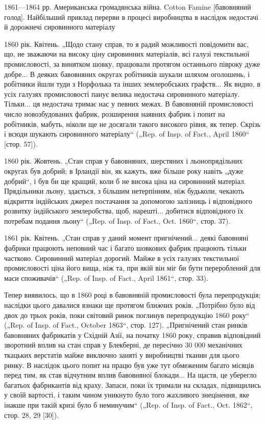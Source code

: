 1861—1864 рр. Американська громадянська війна. Cotton Famine [бавовняний
голод]. Найбільший приклад перерви в процесі виробництва в наслідок
недостачі й дорожнечі сировинного матеріалу

1860 рік. Квітень. „Щодо стану справ, то я радий можливості
повідомити вас, що, не зважаючи на високу ціну сировинних
матеріалів, всі галузі текстильної промисловості, за винятком
шовку, працювали протягом останнього півроку дуже добре...
В деяких бавовняних округах робітників шукали шляхом оголошень,
і робітники йшли туди з Норфолька та інших землеробських
графств... Як видно, в усіх галузях промисловості панує велика недостача
сировинного матеріалу. Тільки... ця недостача тримає нас
у певних межах. В бавовняній промисловості число новозбудованих
фабрик, розширення наявних фабрик і попит на робітників,
мабуть, ніколи ще не досягали такого високого рівня, як
тепер. Скрізь і всюди шукають сировинного матеріалу“ („Rep.
of Insp. of Fact., April 1860“ [стор. 57]).

1860 рік. Жовтень. „Стан справ у бавовняних, шерстяних
і льонопрядільних округах був добрий; в Ірландії він, як кажуть,
вже більше року навіть „дуже добрий“, і був би ще кращий,
коли б не висока ціна на сировинний матеріал. Прядільники
льону, здається, з більшим нетерпінням, ніж будьколи,
чекають відкриття індійських джерел постачання за допомогою
залізниць і відповідного розвитку індійського землеробства, щоб,
нарешті... добитися відповідного їх потребам подання льону“
(„Rep. of Insp. of Fact., Oct. 1860“, стор. 37).

1861 рік. Квітень. „Стан справ у даний момент пригнічений...
деякі бавовняні фабрики працюють неповний час і багато шовкових
фабрик працюють тільки частково. Сировинний матеріал
дорогий. Майже в усіх галузях текстильної промисловості
ціна його вища, ніж та, при якій він міг би бути перероблений
для маси споживачів“ („Rep. of Insp. of Fact., April 1861“, стор. 33).

Тепер виявилось, що в 1860 році в бавовняній промисловості
була перепродукція; наслідки цього давалися взнаки ще протягом
ближчих років. „Потрібно було від двох до трьох років,
поки світовий ринок поглинув перепродукцію 1860 року“ („Rep.
of Insp. of Fact., October 1863“, стор. 127). „Пригнічений стан
ринків бавовняних фабрикатів у Східній Азії, на початку 1860 року,
справив відповідний зворотний вплив на стан справ у Блекберні,
де пересічно 30 000 механічних ткацьких верстатів майже виключно
заняті у виробництві тканин для цього ринку. В наслідок
цього попит на працю був уже тут обмеженим багато місяців
перед тим, як став відчутним вплив бавовняної блокади...
На щастя, це уберегло багатьох фабрикантів від краху. Запаси,
поки їх тримали на складах, підвищились у своїй вартості, і таким
чином уникнуто було того жахливого знецінення, яке
інакше при такій кризі було б неминучим“ („Rep. of Insp. of
Fact., Oct. 1862“, стор. 28, 29 [30]).

